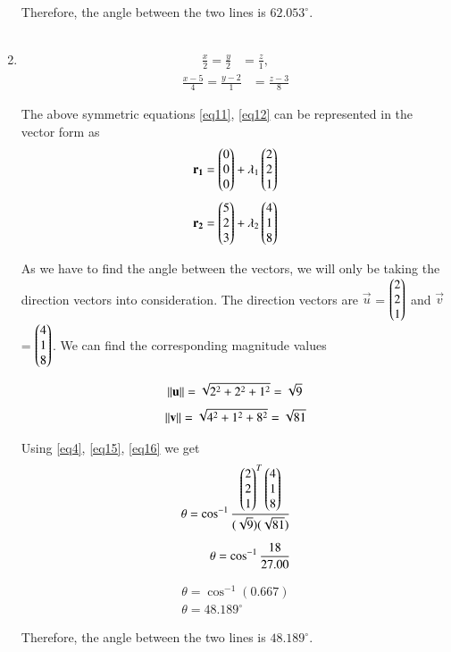 \documentclass[journal,12pt,twocolumn]{IEEEtran}
\begin{document}
\begin{enumerate}
Therefore, the angle between the two lines is $62.053^\circ$.
\\
\\






	\item 
	\begin{align}\label{eq11}
		\frac{x}{2} = \frac{y}{2} &= \frac{z}{1}, 
	\end{align}
	\begin{align}\label{eq12}
		\frac{x-5}{4} = \frac{y-2}{1} &= \frac{z-3}{8} 
	\end{align}



The above symmetric equations \ref{eq11}, \ref{eq12} can be represented in the vector form as 
\begin{align}\label{eq13}
	\quad \mathbf{r_1} &= \begin{pmatrix}0\\0\\0\end{pmatrix} + \lambda_1\begin{pmatrix}2\\2\\1\end{pmatrix}
\end{align}
\begin{align}\label{eq14}
	\quad \mathbf{r_2} &= \begin{pmatrix}5\\2\\3\end{pmatrix} + \lambda_2\begin{pmatrix}4\\1\\8\end{pmatrix}
\end{align}

As we have to find the angle between the vectors, we will only be taking the direction vectors into consideration. The direction vectors are $\vec{u}$ = $\begin{pmatrix}2\\2\\1\end{pmatrix}$ and $\vec{v}$ = $\begin{pmatrix}4\\1\\8\end{pmatrix}$. We can find the corresponding magnitude values

\begin{align}\label{eq15}
	\left\lVert\mathbf{u}\right\rVert =\sqrt{2^{2}+2^{2}+1^{2}} =\sqrt{9}
\end{align}
\begin{align}\label{eq16}
	\left\lVert\mathbf{v}\right\rVert =\sqrt{4^{2}+1^{2}+8^{2}} =\sqrt{81}
\end{align}

Using \ref{eq4}, \ref{eq15}, \ref{eq16} we get
\begin{align}
	\theta = \cos ^{-1}\frac{\begin{pmatrix}2\\2\\1\end{pmatrix}^{T}\begin{pmatrix}4\\1\\8\end{pmatrix}}{(\sqrt{9})(\sqrt{81})} 
	\\[0.2cm]
	\theta = \cos ^{-1}\frac{18}{27.00}
\end{align}

\begin{align}
	\theta = \cos ^{-1} (0.667)
	\\[0.2cm]
	\theta = 48.189^\circ
\end{align}

Therefore, the angle between the two lines is $48.189^\circ$.
\end{enumerate}

    
\end{document}
